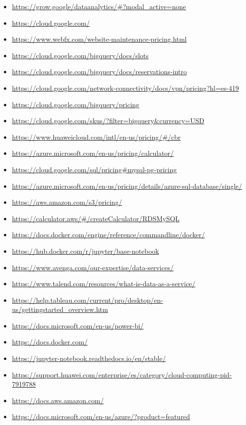 \documentclass[12pt,a4paper,openright]{article}
\begin{document}
\begin{itemize}
    \item \url{https://grow.google/dataanalytics/#?modal_active=none}
    \item \url{https://cloud.google.com/}
    \item \url{https://www.webfx.com/website-maintenance-pricing.html}
    \item \url{https://cloud.google.com/bigquery/docs/slots}
    \item \url{https://cloud.google.com/bigquery/docs/reservations-intro}
    \item \url{https://cloud.google.com/network-connectivity/docs/vpn/pricing?hl=es-419}
    \item \url{https://cloud.google.com/bigquery/pricing}
    \item \url{https://cloud.google.com/skus/?filter=bigquery&currency=USD}
    \item \url{https://www.huaweicloud.com/intl/en-us/pricing/#/cbr}
    \item \url{https://azure.microsoft.com/en-us/pricing/calculator/}
    \item \url{https://cloud.google.com/sql/pricing#mysql-pg-pricing}
    \item \url{https://azure.microsoft.com/en-us/pricing/details/azure-sql-database/single/}
    \item \url{https://aws.amazon.com/s3/pricing/}
    \item \url{https://calculator.aws/#/createCalculator/RDSMySQL}
    \item \url{https://docs.docker.com/engine/reference/commandline/docker/}
    \item \url{https://hub.docker.com/r/jupyter/base-notebook}
    \item \url{https://www.avenga.com/our-expertise/data-services/}
    \item \url{https://www.talend.com/resources/what-is-data-as-a-service/}
    \item \url{https://help.tableau.com/current/pro/desktop/en-us/gettingstarted_overview.htm}
    \item \url{https://docs.microsoft.com/en-us/power-bi/}
    \item \url{https://docs.docker.com/}
    \item \url{https://jupyter-notebook.readthedocs.io/en/stable/}
    \item \url{https://support.huawei.com/enterprise/es/category/cloud-computing-pid-7919788}
    \item \url{https://docs.aws.amazon.com/}
    \item \url{https://docs.microsoft.com/en-us/azure/?product=featured}
\end{itemize}
\end{document}
